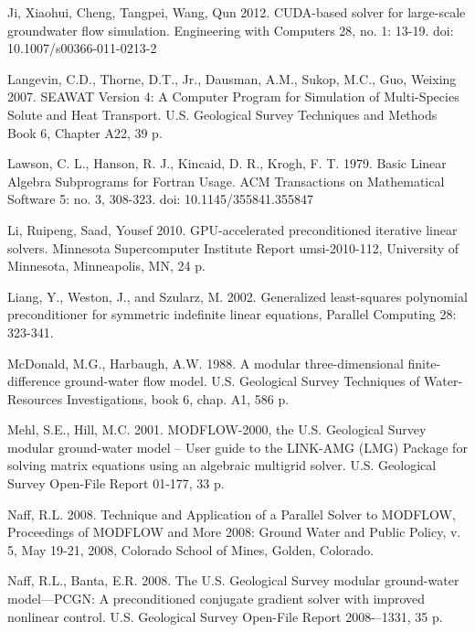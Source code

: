\documentclass[12pt]{article}
\begin{document}
\begin{description}
\item Ji, Xiaohui, Cheng, Tangpei, Wang, Qun 2012. CUDA-based solver for large-scale groundwater flow simulation. Engineering with Computers 28, no. 1: 13-19. doi: 10.1007/s00366-011-0213-2

\item Langevin, C.D., Thorne, D.T., Jr., Dausman, A.M., Sukop, M.C., Guo, Weixing 2007. SEAWAT Version 4: A Computer Program for Simulation of Multi-Species Solute and Heat Transport. U.S. Geological Survey Techniques and Methods Book 6, Chapter A22, 39 p.

\item \color{cyan}Lawson, C. L., Hanson, R. J., Kincaid, D. R., Krogh, F. T. 1979. Basic Linear Algebra Subprograms for Fortran Usage. ACM Transactions on Mathematical Software 5: no. 3, 308-323. doi: 10.1145/355841.355847\color{black}

\item Li, Ruipeng, Saad, Yousef 2010. GPU-accelerated preconditioned iterative linear solvers. Minnesota Supercomputer Institute Report umsi-2010-112, University of Minnesota, Minneapolis, MN, 24 p.

\item Liang, Y., Weston, J., and Szularz, M. 2002. Generalized least-squares polynomial preconditioner for symmetric indefinite linear equations, Parallel Computing 28: 323-341.

\item McDonald, M.G., Harbaugh, A.W. 1988. A modular three-dimensional finite-difference ground-water flow model. U.S. Geological Survey Techniques of Water-Resources Investigations, book 6, chap. A1, 586 p.

\item Mehl, S.E., Hill, M.C. 2001. MODFLOW-2000, the U.S. Geological Survey modular ground-water model -- User guide to the LINK-AMG (LMG) Package for solving matrix equations using an algebraic multigrid solver. U.S. Geological Survey Open-File Report 01-177, 33 p.

\item Naff, R.L. 2008. Technique and Application of a Parallel Solver to MODFLOW, Proceedings of MODFLOW and More 2008: Ground Water and Public Policy, v. 5, May 19-21, 2008, Colorado School of Mines, Golden, Colorado.

\item Naff, R.L., Banta, E.R. 2008. The U.S. Geological Survey modular ground-water model—PCGN: A preconditioned conjugate gradient solver with improved nonlinear control. U.S. Geological Survey Open-File Report 2008-–1331, 35 p.


\end{description}
\end{document}
